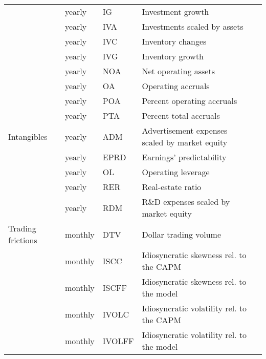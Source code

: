 \begin{landscape}
\begin{ThreePartTable}
\begin{center}
\begin{footnotesize}
\begin{longtabu}{l l l l l}
						& yearly & IG & Investment growth & \cite{xi/2008} \\
						\rule{0pt}{3ex}
						 & yearly & IVA & Investments scaled by assets & \cite{ly/su/zh/2008} \\
						 \rule{0pt}{3ex}
						 & yearly & IVC & Inventory changes & \cite{th/zh/2002} \\
						 \rule{0pt}{3ex}
						 & yearly & IVG & Inventory growth & \cite{be/li/2012} \\
						 \rule{0pt}{3ex}
						 & yearly & NOA & Net operating assets & \cite{hi/ho/te/zh/2004} \\
						 \rule{0pt}{3ex}
						 & yearly & OA & Operating accruals & \cite{sl/1996} \\
						 \rule{0pt}{3ex}
						 & yearly & POA & Percent operating accruals & \cite{ha/lu/va/2011} \\
						 \rule{0pt}{3ex}
						 & yearly & PTA & Percent total accruals & \cite{ha/lu/va/2011} \\
						 \hline 
						\rule{0pt}{3ex}
						Intangibles & yearly & ADM & Advertisement expenses scaled by market equity & \cite{ch/la/so/2001} \\
                      \rule{0pt}{3ex}
						 & yearly & EPRD & Earnings' predictability & \cite{fr/la/ol/sc/2004} \\
						\rule{0pt}{3ex}
						 & yearly & OL & Operating leverage & \cite{no/2011} \\
                      \rule{0pt}{3ex}
						 & yearly & RER & Real-estate ratio & \cite{tu/2010} \\
						 \rule{0pt}{3ex}
						 & yearly & RDM & R\&D expenses scaled by market equity & \cite{ch/la/so/2001} \\
						 \hline 
						 \rule{0pt}{3ex}
						 Trading frictions & monthly & DTV  & Dollar trading volume  & \cite{br/ch/su/1998} \\
                      \rule{0pt}{3ex}
						 & monthly & ISCC  & Idiosyncratic skewness rel. to the CAPM & \cite{ba/en/mu/2016} \\
                      \rule{0pt}{3ex}
						 & monthly & ISCFF  & Idiosyncratic skewness rel. to the \cite{fa/fr/1993} model & \cite{ba/en/mu/2016} \\
                      \rule{0pt}{3ex}
						 & monthly & IVOLC  & Idiosyncratic volatility rel. to the CAPM & \cite{an/ho/xi/zh/2006} \\
                      \rule{0pt}{3ex}
						 & monthly & IVOLFF  & Idiosyncratic volatility rel. to the \cite{fa/fr/1993} model & \cite{an/ho/xi/zh/2006} \\
						\bottomrule
					\end{longtabu}
				\end{footnotesize}
			\end{center}
		\end{ThreePartTable}
	
	\end{landscape}
	
	
